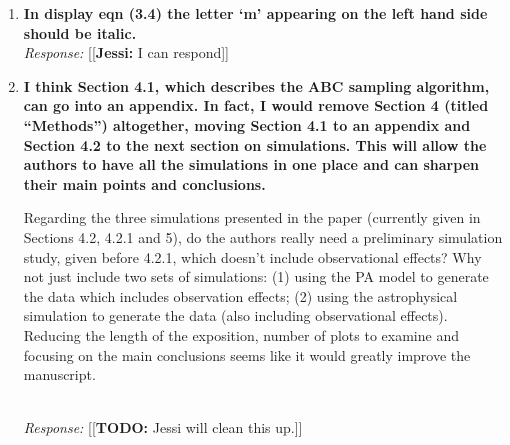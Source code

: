 \documentclass[11pt, oneside]{article}   	%
\newcommand{\jessi}[1]{{\color{blue}[[\textbf{Jessi: }#1]]}}
\newcommand{\todo}[1]{{\color{red}[[\textbf{TODO: }#1]]}}
\begin{document}
\begin{enumerate}
{This statement confuses me a bit. It seems to suggest that we only observe the initial formation of star clusters. I would expect the opposite, i.e. that the star clusters we observe are a mix of old and new clusters that have developed over different time ranges. Perhaps the authors are getting at a selection effect where the old star clusters are more dim and are effectively censored due to the sensitivity of our instruments. Either way, this paragraph could use some cleaning up.} \\
\noindent \emph{Response:} \jessi{I can respond}
\bigskip

\item {\bf In display eqn (3.4) the letter `m' appearing on the left hand side should be italic.} \\
\noindent \emph{Response:} \jessi{I can respond}
\bigskip

\item {\bf I think Section 4.1, which describes the ABC sampling algorithm, can go into an appendix. In fact, I would remove Section 4 (titled ``Methods'') altogether, moving Section 4.1 to an appendix and Section 4.2 to the next section on simulations. This will allow the authors to have all the simulations in one place and can sharpen their main points and conclusions.

Regarding the three simulations presented in the paper (currently given in Sections 4.2, 4.2.1 and 5), do the authors really need a preliminary simulation study, given before 4.2.1, which doesn't include observational effects? Why not just include two sets of simulations: (1) using the PA model to generate the data which includes observation effects; (2) using the astrophysical simulation to generate the data (also including observational effects). Reducing the length of the exposition, number of plots to examine and focusing on the main conclusions seems like it would greatly improve the manuscript.
}\\
\noindent \emph{Response:} \todo{Jessi will clean this up.}
\bigskip
\end{enumerate}
\end{document}
